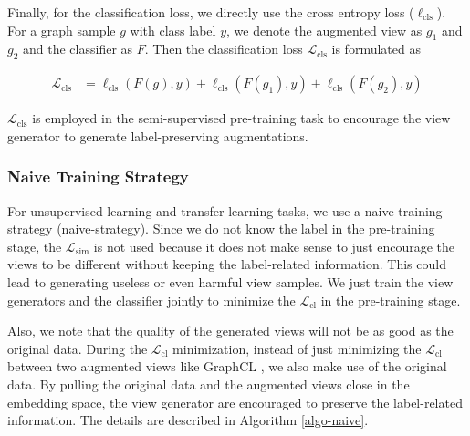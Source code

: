 Finally, for the classification loss, we directly use the cross entropy loss ($\ell_\text{cls}$). For a graph sample $g$ with class label $y$, we denote the augmented view as $g_1$ and $g_2$ and the classifier as $F$. Then the classification loss $\mathcal{L}_{\text{cls}}$ is formulated as
\begin{small}
    \begin{align}
    \mathcal{L}_{\text{cls}} &= \ell_\text{cls}(F(g), y) + \ell_\text{cls}(F(g_1), y) + \ell_\text{cls}(F(g_2), y)
    \end{align}
\end{small}
$\mathcal{L}_{\text{cls}}$ is employed in the semi-supervised pre-training task to encourage the view generator to generate label-preserving augmentations. 

\subsubsection{Naive Training Strategy}

For unsupervised learning and transfer learning tasks, we use a naive training strategy (naive-strategy). Since we do not know the label in the pre-training stage, the $\mathcal{L}_{\text{sim}}$ is not used because it does not make sense to just encourage the views to be different without keeping the label-related information. This could lead to generating useless or even harmful view samples. We just train the view generators and the classifier jointly to minimize the $\mathcal{L}_{\text{cl}}$ in the pre-training stage. 

Also, we note that the quality of the generated views will not be as good as the original data. During the $\mathcal{L}_{\text{cl}}$ minimization, instead of just minimizing the $\mathcal{L}_{\text{cl}}$ between two augmented views like GraphCL \cite{you2020graphcl}, we also make use of the original data. By pulling the original data and the augmented views close in the embedding space, the view generator are encouraged to preserve the label-related information. The details are described in Algorithm \ref{algo-naive}.

